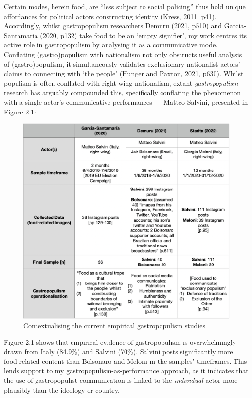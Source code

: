\documentclass[a4paper, nobind]{templates/ociamthesis}
\begin{document}
Certain modes, herein food, are ``less subject to social policing'' thus hold unique affordances for political actors constructing identity (Kress, 2011, p41). Accordingly, whilst gastropopulism researchers Demuru (2021, p510) and Garcia-Santamaria (2020, p132) take food to be an `empty signifier', my work centres its active role in gastropopulism by analysing it as a communicative mode. Conflating (gastro)populism with nationalism not only obstructs useful analysis of (gastro)populism, it simultaneously validates exclusionary nationalist actors' claims to connecting with `the people' (Hunger and Paxton, 2021, p630). Whilst populism is often conflated with right-wing nationalism, extant \emph{gastropopulism} research has arguably compounded this, specifically conflating the phenomenon with a single actor's communicative performances --- Matteo Salvini, presented in Figure 2.1:

\begin{figure}
\includegraphics[width=1\linewidth]{DissdataIMAGES/gastrostudies} \caption{Contextualising the current empirical gastropopulism studies}\label{fig:unnamed-chunk-1}
\end{figure}

Figure 2.1 shows that empirical evidence of gastropopulism is overwhelmingly drawn from Italy (84.9\%) and Salvini (70\%). Salvini posts significantly more food-related content than Bolsonaro and Meloni in the samples' timeframes. This lends support to my gastropopulism-as-performance approach, as it indicates that the use of gastropopulist communication is linked to the \emph{individual} actor more plausibly than the ideology or country.
\end{document}
